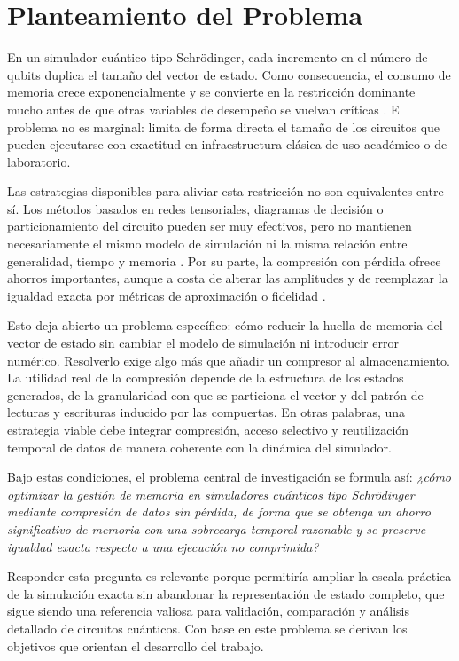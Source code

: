 \section{Planteamiento del Problema}

En un simulador cuántico tipo Schr\"odinger, cada incremento en el número de qubits duplica el tamaño del vector de estado. Como consecuencia, el consumo de memoria crece exponencialmente y se convierte en la restricción dominante mucho antes de que otras variables de desempeño se vuelvan críticas \parencite{Jones2019,wu2019full}. El problema no es marginal: limita de forma directa el tamaño de los circuitos que pueden ejecutarse con exactitud en infraestructura clásica de uso académico o de laboratorio.

Las estrategias disponibles para aliviar esta restricción no son equivalentes entre sí. Los
métodos basados en redes tensoriales, diagramas de decisión o particionamiento del
circuito pueden ser muy efectivos, pero no mantienen necesariamente el mismo modelo
de simulación ni la misma relación entre generalidad, tiempo y memoria
\parencite{Vidal2003,Viamontes2003,Chen2018}. Por su parte, la compresión con pérdida
ofrece ahorros importantes, aunque a costa de alterar las amplitudes y de reemplazar la
igualdad exacta por métricas de aproximación o fidelidad \parencite{wu2018amplitude,DiazToro2025}.

Esto deja abierto un problema específico: cómo reducir la huella de memoria del vector de estado sin cambiar el modelo de simulación ni introducir error numérico. Resolverlo exige algo más que añadir un compresor al almacenamiento. La utilidad real de la compresión depende de la estructura de los estados generados, de la granularidad con que se particiona el vector y del patrón de lecturas y escrituras inducido por las compuertas. En otras palabras, una estrategia viable debe integrar compresión, acceso selectivo y reutilización temporal de datos de manera coherente con la dinámica del simulador.

Bajo estas condiciones, el problema central de investigación se formula así: \textit{¿cómo optimizar la gestión de memoria en simuladores cuánticos tipo Schr\"odinger mediante compresión de datos sin pérdida, de forma que se obtenga un ahorro significativo de memoria con una sobrecarga temporal razonable y se preserve igualdad exacta respecto a una ejecución no comprimida?}

Responder esta pregunta es relevante porque permitiría ampliar la escala práctica de la simulación exacta sin abandonar la representación de estado completo, que sigue siendo una referencia valiosa para validación, comparación y análisis detallado de circuitos cuánticos. Con base en este problema se derivan los objetivos que orientan el desarrollo del trabajo.
